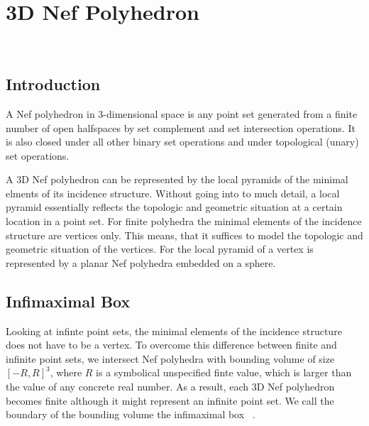
\ccParDims

\chapter{3D Nef Polyhedron}
\label{chapterNef_3}
\\

\minitoc

\section{Introduction}

A Nef polyhedron in 3-dimensional space is
any point set generated from a finite number of open halfspaces by set
complement and set intersection operations. It is also closed under 
all other binary set operations and under topological (unary) set operations. 

A 3D Nef polyhedron can be represented by the local pyramids of the minimal
elments of its incidence structure. Without going into to much detail, a local
pyramid essentially reflects the topologic and geometric situation at a certain
location in a point set. For finite polyhedra the minimal elements 
of the incidence structure are vertices only. This means, that it suffices to 
model the topologic and geometric situation of the vertices. For 
 the local pyramid of a vertex is represented by 
a planar Nef polyhedra embedded on a sphere.

\section{Infimaximal Box}
\label{sectionNef_3InfiBox}

Looking at infinte point sets, the minimal elements of the incidence structure 
does not have to be a vertex. To overcome this difference between finite and 
infinite point sets, we intersect Nef polyhedra with
bounding volume of size $[-R,R]^3$, where $R$ is a symbolical unspecified finte 
value, which is larger than the value of any concrete real number. As a result,
each 3D Nef polyhedron becomes finite although it might represent an infinite
point set. We call the boundary of the bounding volume the infimaximal box
~\cite{cgal:sm-iftml-00}.

